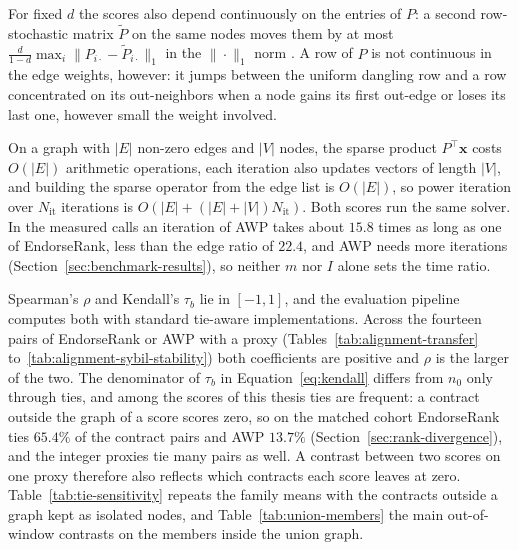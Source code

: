 For fixed $d$ the scores also depend continuously on the entries of $P$: a second row-stochastic matrix $\tilde P$ on the same nodes moves them by at most $\frac{d}{1-d}\max_i\|P_{i\cdot}-\tilde P_{i\cdot}\|_1$ in the $\|\cdot\|_1$ norm \parencite{langville2006pagerank}. A row of $P$ is not continuous in the edge weights, however: it jumps between the uniform dangling row and a row concentrated on its out-neighbors when a node gains its first out-edge or loses its last one, however small the weight involved.\label{sec:pr-continuity}


On a graph with $|E|$ non-zero edges and $|V|$ nodes, the sparse product $P^{\top}\mathbf{x}$ costs $O(|E|)$ arithmetic operations, each iteration also updates vectors of length $|V|$, and building the sparse operator from the edge list is $O(|E|)$, so power iteration over $N_{\mathrm{it}}$ iterations is $O(|E|+(|E|+|V|)N_{\mathrm{it}})$. Both scores run the same solver. In the measured calls an iteration of AWP takes about $15.8$ times as long as one of EndorseRank, less than the edge ratio of $22.4$, and AWP needs more iterations (Section~\ref{sec:benchmark-results}), so neither $m$ nor $I$ alone sets the time ratio.

\label{sec:spearman-properties}

Spearman's $\rho$ and Kendall's $\tau_b$ lie in $[-1,1]$, and the evaluation pipeline computes both with standard tie-aware implementations. Across the fourteen pairs of EndorseRank or AWP with a proxy (Tables~\ref{tab:alignment-transfer} to~\ref{tab:alignment-sybil-stability}) both coefficients are positive and $\rho$ is the larger of the two. The denominator of $\tau_b$ in Equation~\eqref{eq:kendall} differs from $n_0$ only through ties, and among the scores of this thesis ties are frequent: a contract outside the graph of a score scores zero, so on the matched cohort EndorseRank ties $65.4\%$ of the contract pairs and AWP $13.7\%$ (Section~\ref{sec:rank-divergence}), and the integer proxies tie many pairs as well. A contrast between two scores on one proxy therefore also reflects which contracts each score leaves at zero. Table~\ref{tab:tie-sensitivity} repeats the family means with the contracts outside a graph kept as isolated nodes, and Table~\ref{tab:union-members} the main out-of-window contrasts on the members inside the union graph.
